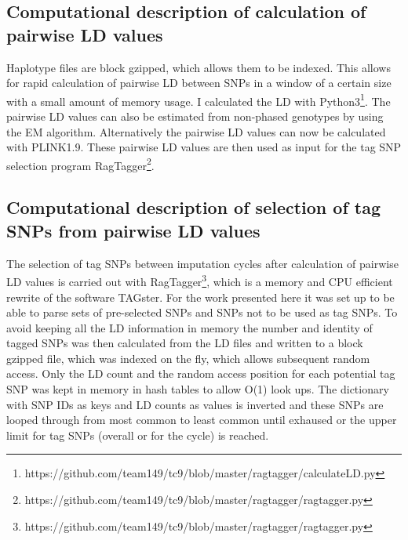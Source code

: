 
\subsection{Computational description of calculation of pairwise \gls{LD} values}
Haplotype files are block gzipped\cite{Li05012011}, which allows them to be indexed. This allows for rapid calculation of pairwise \gls{LD} between \glspl{SNP} in a window of a certain size with a small amount of memory usage. I calculated the LD with Python3\footnote{https://github.com/team149/tc9/blob/master/ragtagger/calculateLD.py}. The pairwise \gls{LD} values can also be estimated from non-phased genotypes by using the \gls{EM} algorithm.
Alternatively the pairwise \gls{LD} values can now be calculated with PLINK1.9\cite{25722852}. These pairwise LD values are then used as input for the tag SNP selection program RagTagger\footnote{https://github.com/team149/tc9/blob/master/ragtagger/ragtagger.py}.

\subsection{Computational description of selection of tag \glspl{SNP} from pairwise \gls{LD} values}
The selection of tag \glspl{SNP} between imputation cycles after calculation of pairwise \gls{LD} values is carried out with RagTagger\footnote{https://github.com/team149/tc9/blob/master/ragtagger/ragtagger.py}, which is a memory and \gls{CPU} efficient rewrite of the software TAGster.\cite{Xu2007} For the work presented here it was set up to be able to parse sets of pre-selected SNPs and SNPs not to be used as tag SNPs. To avoid keeping all the \gls{LD} information in memory the number and identity of tagged SNPs was then calculated from the \gls{LD} files and written to a block gzipped\cite{Li05012011} file, which was indexed on the fly, which allows subsequent random access. Only the \gls{LD} count and the random access position for each potential tag SNP was kept in memory in hash tables to allow O(1) look ups. The dictionary with SNP IDs as keys and LD counts as values is inverted and these SNPs are looped through from most common to least common until exhaused or the upper limit for tag SNPs (overall or for the cycle) is reached.